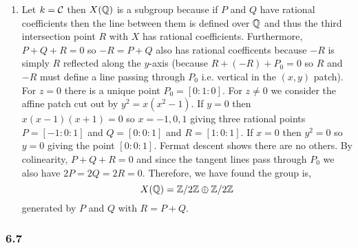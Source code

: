 \documentclass[12pt]{article}
\begin{document}
\begin{enumerate}
\item Let $k = \mathcal{C}$ then $X(\mathbb{Q})$ is a subgroup because if $P$ and $Q$ have rational coefficients then the line between them is defined over $\mathbb{Q}$ and thus the third intersection point $R$ with $X$ has rational coefficients. Furthermore, $P + Q + R = 0$ so $-R = P + Q$ also has rational coefficents because $-R$ is simply $R$ reflected along the $y$-axis (because $R + (-R) + P_0 = 0$ so $R$ and $-R$ must define a line passing through $P_0$ i.e. vertical in the $(x,y)$ patch). 
\bigskip\\
For $z = 0$ there is a unique point $P_0 = [0:1:0]$. For $z \neq 0$ we consider the affine patch cut out by $y^2 = x(x^2 - 1)$. If $y = 0$ then $x(x - 1)(x + 1) = 0$ so $x = -1, 0, 1$ giving three rational points $P = [-1 : 0 : 1]$ and $Q = [0 : 0 : 1]$ and $R = [1 : 0 : 1]$. If $x = 0$ then $y^2 = 0$ so $y = 0$ giving the point $[0 : 0 : 1]$. Fermat descent shows there are no others. By colinearity, $P + Q + R = 0$ and since the tangent lines pass through $P_0$ we also have $2 P = 2 Q = 2 R = 0$. Therefore, we have found the group is,
\[ X(\mathbb{Q}) = \mathbb{Z} / 2 \mathbb{Z} \oplus \mathbb{Z} / 2 \mathbb{Z} \]
generated by $P$ and $Q$ with $R = P + Q$.
\end{enumerate}

\subsubsection{6.7}

\newcommand{\CaClcirc}[1]{\mathbb{CaCl}^\circ\left( #1 \right)}
\end{document}
